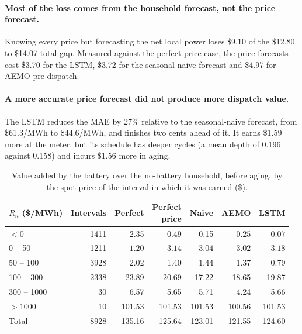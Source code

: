 \paragraph{Most of the loss comes from the household forecast, not the price forecast.}
Knowing every price but forecasting the net local power loses \$9.10 of the
\$12.80 to \$14.07 total gap. Measured against the perfect-price case, the price
forecasts cost \$3.70 for the LSTM, \$3.72 for the seasonal-naive forecast and \$4.97
for AEMO pre-dispatch.

\paragraph{A more accurate price forecast did not produce more dispatch value.}
The LSTM reduces the MAE by 27\% relative to the seasonal-naive forecast, from
\$61.3/MWh to \$44.6/MWh, and finishes two cents ahead of it. It earns \$1.59 more at
the meter, but its schedule has deeper cycles (a mean depth of 0.196 against 0.158) and
incurs \$1.56 more in aging.

\begin{table}[htbp]
    \centering
    \small
    \caption{Value added by the battery over the no-battery household, before aging,
    by the spot price of the interval in which it was earned (\$).}
    \label{tab:mpc:bands}
    \begin{tabular}{@{}lrrrrrr@{}}
        \toprule
        $R_n$ (\$/MWh) & Intervals & Perfect & \shortstack{Perfect\\price} & Naive & AEMO & LSTM \\
        \midrule
        $< 0$       & 1411 & 2.35   & $-0.49$ & 0.15   & $-0.25$ & $-0.07$ \\
        0 -- 50     & 1211 & $-1.20$ & $-3.14$ & $-3.04$ & $-3.02$ & $-3.18$ \\
        50 -- 100   & 3928 & 2.02   & 1.40   & 1.44   & 1.37   & 0.79 \\
        100 -- 300  & 2338 & 23.89  & 20.69  & 17.22  & 18.65  & 19.87 \\
        300 -- 1000 & 30   & 6.57   & 5.65   & 5.71   & 4.24   & 5.66 \\
        $> 1000$    & 10   & 101.53 & 101.53 & 101.53 & 100.56 & 101.53 \\
        \midrule
        Total       & 8928 & 135.16 & 125.64 & 123.01 & 121.55 & 124.60 \\
        \bottomrule
    \end{tabular}
\end{table}

